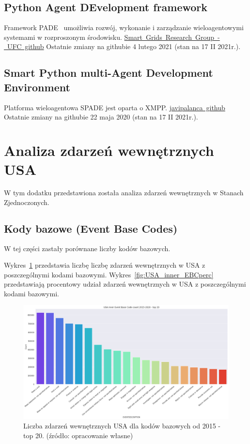 \documentclass[11pt]{report}
\begin{document}
    \subsection{Python Agent DEvelopment framework}
    Framework PADE~\cite{Melo2019} umożliwia rozwój, wykonanie i zarządzanie wieloagentowymi systemami w rozproszonym środowisku.
    \href{https://github.com/grei-ufc/pade}{Smart~Grids~Research~Group~-~UFC~github}
    Ostatnie zmiany na githubie 4 lutego 2021 (stan na 17 II 2021r.).

    \subsection{Smart Python multi-Agent Development Environment}
    Platforma wieloagentowa SPADE jest oparta o XMPP\cite{Saint-Andre2007}.
    \href{https://github.com/javipalanca/spade}{javipalanca~github}
    Ostatnie zmiany na githubie 22 maja 2020 (stan na 17 II 2021r.).


    \section{Analiza zdarzeń wewnętrznych USA}
    W tym dodatku przedstawiona została analiza zdarzeń wewnętrznych w Stanach Zjednoczonych.

    \subsection{Kody bazowe (Event Base Codes)}
    W tej części zastały porównane liczby kodów bazowych.

    Wykres~\ref{fig:USA_inner_EBC} przedstawia liczbę liczbę zdarzeń wewnętrznych w USA z poszczególnymi kodami bazowymi.
    Wykres~\ref{fig:USA_inner_EBCperc} przedstawiają procentowy udział zdarzeń wewnętrznych w USA z poszczególnymi kodami bazowymi.

    \begin{figure}[!htp]
        \centering
        \includegraphics[width=\linewidth]{fig/USA inner/EBC.png}
        \caption{Liczba zdarzeń wewnętrznych USA dla kodów bazowych od 2015 - top 20. (źródło: opracowanie własne)}
        \label{fig:USA_inner_EBC}
    \end{figure}
\end{document}
